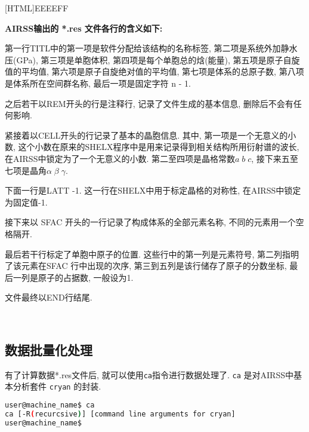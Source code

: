 \documentclass[a4paper, 10pt]{article}
\begin{document}
\noindent{}[HTML]{EEEEFF}{\parbox{\textwidth}{%
\noindent \textbf{AIRSS输出的 *.res 文件各行的含义如下:}
\begin{maineu}
\item 第一行TITL中的第一项是软件分配给该结构的名称标签, 第二项是系统外加静水压(GPa), 第三项是单胞体积, 第四项是每个单胞总的焓(能量), 第五项是原子自旋值的平均值, 第六项是原子自旋绝对值的平均值, 第七项是体系的总原子数, 第八项是体系所在空间群名称, 最后一项是固定字符 n - 1.
\item 之后若干以REM开头的行是注释行, 记录了文件生成的基本信息, 删除后不会有任何影响.
\item 紧接着以CELL开头的行记录了基本的晶胞信息. 其中, 第一项是一个无意义的小数, 这个小数在原来的SHELX程序中是用来记录得到相关结构所用衍射谱的波长, 在AIRSS中锁定为了一个无意义的小数. 第二至四项是晶格常数\(a\;b\;c\), 接下来五至七项是晶角\(\alpha\;\beta\;\gamma\).
\item 下面一行是LATT -1. 这一行在SHELX中用于标定晶格的对称性, 在AIRSS中锁定为固定值-1.
\item 接下来以 SFAC 开头的一行记录了构成体系的全部元素名称, 不同的元素用一个空格隔开.
\item 最后若干行标定了单胞中原子的位置. 这些行中的第一列是元素符号, 第二列指明了该元素在SFAC 行中出现的次序, 第三到五列是该行储存了原子的分数坐标, 最后一列是原子的占据数, 一般设为1.
\item 文件最终以END行结尾.
\end{maineu}}}\\

\subsection{数据批量化处理}
有了计算数据*.res文件后, 就可以使用\verb|ca|指令进行数据处理了. \verb|ca| 是对AIRSS中基本分析套件 \verb|cryan| 的封装. 
\begin{lstlisting}[language={bash}]
user@machine_name$ ca
ca [-R(recurcsive)] [command line arguments for cryan]
user@machine_name$
\end{lstlisting}
\end{document}
